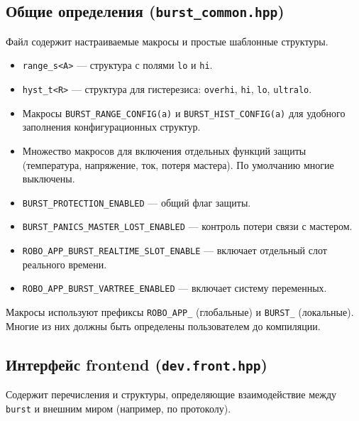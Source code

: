 \documentclass[a4paper,12pt]{article}
\begin{document}
\subsection{Общие определения (\texttt{burst\_common.hpp})}

Файл содержит настраиваемые макросы и простые шаблонные структуры.

\begin{itemize}
    \item \texttt{range\_s<A>} — структура с полями \texttt{lo} и \texttt{hi}.
    \item \texttt{hyst\_t<R>} — структура для гистерезиса: \texttt{overhi}, \texttt{hi}, \texttt{lo}, \texttt{ultralo}.
    \item Макросы \texttt{BURST\_RANGE\_CONFIG(a)} и \texttt{BURST\_HIST\_CONFIG(a)} для удобного заполнения конфигурационных структур.
    \item Множество макросов для включения отдельных функций защиты (температура, напряжение, ток, потеря мастера). По умолчанию многие выключены.
    \item \texttt{BURST\_PROTECTION\_ENABLED} — общий флаг защиты.
    \item \texttt{BURST\_PANICS\_MASTER\_LOST\_ENABLED} — контроль потери связи с мастером.
    \item \texttt{ROBO\_APP\_BURST\_REALTIME\_SLOT\_ENABLE} — включает отдельный слот реального времени.
    \item \texttt{ROBO\_APP\_BURST\_VARTREE\_ENABLED} — включает систему переменных.
\end{itemize}

Макросы используют префиксы \texttt{ROBO\_APP\_} (глобальные) и \texttt{BURST\_} (локальные). Многие из них должны быть определены пользователем до компиляции.

\subsection{Интерфейс frontend (\texttt{dev.front.hpp})}

Содержит перечисления и структуры, определяющие взаимодействие между \texttt{burst} и внешним миром (например, по протоколу).
\end{document}
